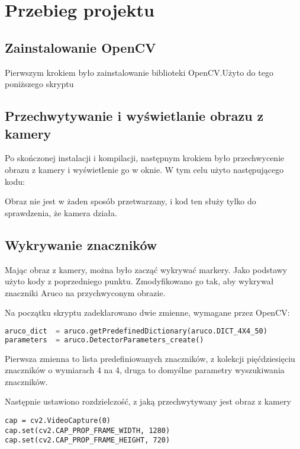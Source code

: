 \section{Przebieg projektu}
\subsection{Zainstalowanie OpenCV}

Pierwszym krokiem było zainstalowanie biblioteki OpenCV.\@ Użyto do tego poniższego skryptu



\subsection{Przechwytywanie i wyświetlanie obrazu z kamery}
Po skończonej instalacji i kompilacji, następnym krokiem było przechwycenie obrazu z kamery i
wyświetlenie go w oknie. W tym celu użyto następującego kodu:



Obraz nie jest w żaden sposób przetwarzany, i kod ten służy tylko do sprawdzenia, że kamera działa.

\subsection{Wykrywanie znaczników}

Mając obraz z kamery, można było zacząć wykrywać markery. Jako podstawy użyto kody z
poprzedniego punktu. Zmodyfikowano go tak, aby wykrywał znaczniki Aruco na przychwyconym
obrazie.

Na początku skryptu zadeklarowano dwie zmienne, wymagane przez OpenCV:

\begin{lstlisting}[language=Python]
aruco_dict  = aruco.getPredefinedDictionary(aruco.DICT_4X4_50)
parameters  = aruco.DetectorParameters_create()
\end{lstlisting}

Pierwsza zmienna to lista predefiniowanych znaczników, z kolekcji pięćdziesięciu znaczników o
wymiarach 4 na 4, druga to domyślne parametry
wyszukiwania znaczników.

Następnie ustawiono rozdzielczość, z jaką przechwytywany jest obraz z kamery

\begin{lstlisting}
cap = cv2.VideoCapture(0)
cap.set(cv2.CAP_PROP_FRAME_WIDTH, 1280)
cap.set(cv2.CAP_PROP_FRAME_HEIGHT, 720)
\end{lstlisting}

